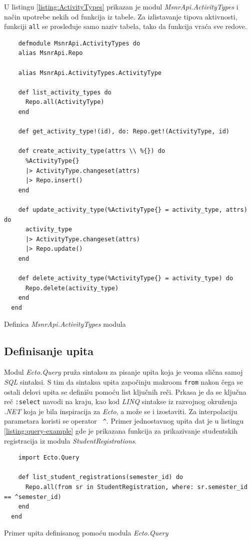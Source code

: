 \documentclass[12pt,oneside]{memoir}
\begin{document}
U listingu \ref{listing:ActivityTypes} prikazan je modul
\emph{MsnrApi.ActivityTypes} i način upotrebe nekih od funkcija iz tabele. Za izlistavanje tipova aktivnosti,
funkciji \texttt{all} se prosleđuje samo naziv tabela, tako da funkcija vraća sve redove.
\begin{listing}[!h]
  \begin{verbatim}
    defmodule MsnrApi.ActivityTypes do
    alias MsnrApi.Repo
  
    alias MsnrApi.ActivityTypes.ActivityType
  
    def list_activity_types do
      Repo.all(ActivityType)
    end
  
    def get_activity_type!(id), do: Repo.get!(ActivityType, id)
  
    def create_activity_type(attrs \\ %{}) do
      %ActivityType{}
      |> ActivityType.changeset(attrs)
      |> Repo.insert()
    end
  
    def update_activity_type(%ActivityType{} = activity_type, attrs) do
      activity_type
      |> ActivityType.changeset(attrs)
      |> Repo.update()
    end
  
    def delete_activity_type(%ActivityType{} = activity_type) do
      Repo.delete(activity_type)
    end
  end
\end{verbatim}
\caption{Definica \emph{MsnrApi.ActivityTypes} modula}
\label{listing:ActivityTypes}
\end{listing}

\subsection{Definisanje upita}
Modul \emph{Ecto.Query} pruža sintaksu za pisanje upita koja je veoma slična samoj \emph{SQL} sintaksi. 
S tim da sintaksa upita započinju makroom \texttt{from} nakon čega se ostali delovi upita se definišu pomoću list ključnih reči.
Prkasa je da se ključna reč \texttt{:select} navodi na kraju, kao kod \emph{LINQ} \cite{linq} sintakse iz razvojnog okruženja \emph{.NET}
koja je bila inspiracija za \emph{Ecto}, a može se i izostaviti. Za interpolaciju parametara koristi se operator \texttt{ \^{}}.
Primer jednostavnog upita dat je u listingu \ref{listing:query-example} gde je prikazana funkcija za prikazivanje studentskih
registracija iz modula \emph{StudentRegistrations}.
\begin{listing}[h]
  \begin{verbatim}
    import Ecto.Query

    def list_student_registrations(semester_id) do
      Repo.all(from sr in StudentRegistration, where: sr.semester_id == ^semester_id)
    end
  end
  \end{verbatim}
\caption{Primer upita definisanog pomoću modula \emph{Ecto.Query}}
\label{listing:query-example}
\end{listing}
\end{document}
